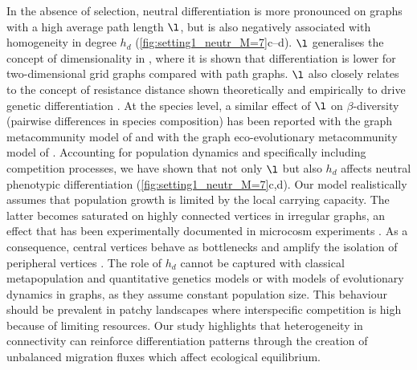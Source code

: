In the absence of selection, neutral differentiation is more pronounced on graphs with a high average path length $\l$, but is also negatively associated with homogeneity in degree $h_d$ (\cref{fig:setting1_neutr_M=7}c--d).
%
$\l$ generalises the concept of dimensionality in \citep{Kimura1964,Lande1991,Nagylaki1994}, where it is shown that differentiation is lower for two-dimensional grid graphs compared with path graphs. $\l$ also closely relates to the concept of resistance distance shown theoretically and empirically to drive genetic differentiation \citep{McRae2006,McRae2007}.
%
At the species level, a similar effect of $\l$ on $\beta$-diversity (pairwise differences in species composition) has been reported with the graph metacommunity model of \citep{Carrara2012} and with the graph eco-evolutionary metacommunity model of \citep{Economo2007}.
%
Accounting for population dynamics and specifically including competition processes, we have shown that not only $\l$ but also $h_d$ affects neutral phenotypic differentiation (\cref{fig:setting1_neutr_M=7}c,d).
%
Our model realistically assumes that population growth is limited by the local carrying capacity. The latter becomes saturated on highly connected vertices in irregular graphs, an effect that has been experimentally documented in microcosm experiments \citep{Altermatt2018}. As a consequence, central vertices behave as bottlenecks and amplify the isolation of peripheral vertices \citep{Orsini2013}.
%
The role of $h_d$ cannot be captured with classical metapopulation and quantitative genetics models or with models of evolutionary dynamics in graphs, as they assume constant population size.
% 
This behaviour should be prevalent in patchy landscapes where interspecific competition is high because of limiting resources.
%
Our study highlights that heterogeneity in connectivity can reinforce differentiation patterns through the creation of unbalanced migration fluxes which affect ecological equilibrium.

